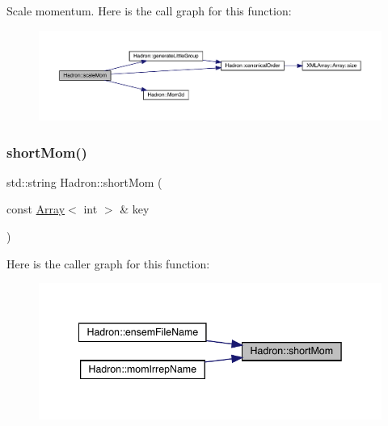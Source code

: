 Scale momentum. Here is the call graph for this function\+:
\nopagebreak
\begin{figure}[H]
\begin{center}
\leavevmode
\includegraphics[width=350pt]{d1/daf/namespaceHadron_ab3424b316e2a4d8e820c88f8027742e1_cgraph}
\end{center}
\end{figure}
\mbox{\label{namespaceHadron_aaaec62d26ea28ccc4d611b4797a1d667}} 
\subsubsection{\texorpdfstring{shortMom()}{shortMom()}}
{\footnotesize\ttfamily std\+::string Hadron\+::short\+Mom (\begin{DoxyParamCaption}\item[{const \mbox{\hyperlink{classXMLArray_1_1Array}{Array}}$<$ int $>$ \&}]{key }\end{DoxyParamCaption})}

Here is the caller graph for this function\+:
\nopagebreak
\begin{figure}[H]
\begin{center}
\leavevmode
\includegraphics[width=342pt]{d1/daf/namespaceHadron_aaaec62d26ea28ccc4d611b4797a1d667_icgraph}
\end{center}
\end{figure}
\mbox{\label{namespaceHadron_aaa6ace3b1a5c63de278a8bcb9fa80c49}} 

